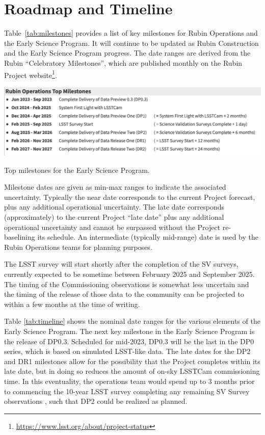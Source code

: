 \section{Roadmap and Timeline} \label{sec:timeline}

Table~\ref{tab:milestones} provides a list of key milestones for Rubin Operations and the Early Science Program.
It will continue to be updated as Rubin Construction and the Early Science Program progress. 
The date ranges are derived from the Rubin ``Celebratory Milestones'', which are  published monthly on the Rubin Project website\footnote{\url{https://www.lsst.org/about/project-status}}. 

\begin{table}[ht]
\centering
\includegraphics[width=\linewidth]{figures/DPR-milestones}
\caption{Top milestones for the Early Science Program.}
\label{tab:milestones}
\end{table}

Milestone dates are given as min-max ranges to indicate the associated uncertainty. 
Typically the near date corresponds to the current Project forecast, plus any additional operational uncertainty.
The late date corresponds (approximately) to the current Project ``late date'' plus any additional operational uncertainty and cannot be surpassed without the Project re-baselining its schedule.
An intermediate (typically mid-range) date is used by the Rubin Operations teams for planning purposes. 

The LSST survey will start shortly after the completion of the SV surveys, currently expected to be sometime between February 2025 and September 2025.
The timing of the Commissioning observations is somewhat less uncertain and the timing of the release of those data to the community can be projected to within a few months at the time of writing.

Table \ref{tab:timeline} shows the nominal date ranges for the various elements of the Early Science Program. 
The next key milestone in the Early Science Program is the release of DP0.3. 
Scheduled for mid-2023, DP0.3 will be the last in the DP0 series, which is based on simulated LSST-like data. 
The late dates for the DP2 and DR1 milestones allow for the possibility that the Project completes within its late date, but in doing so reduces the amount of on-sky LSSTCam commissioning time.
In this eventuality, the operations team would spend up to 3 months prior to commencing the 10-year LSST survey completing any remaining SV Survey observations , such that DP2 could be realized as planned.

